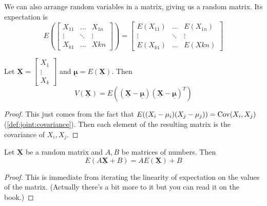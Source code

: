 \documentclass[12pt]{extarticle}
\newcommand{\cov}{{\operatorfont Cov}}
\renewcommand{\vec}[1]{\underline{\mathbf{#1}}}
\begin{document}
We can also arrange random variables in a matrix, giving us a random matrix.
Its expectation is
\begin{equation}
    E\left(\begin{bmatrix}
        X_{11} & \dots  & X_{1n} \\
        \vdots & \ddots & \vdots \\
        X_{k1} & \dots  & X{kn}
    \end{bmatrix}\right) =
    \begin{bmatrix}
        E(X_{11}) & \dots  & E(X_{1n}) \\
        \vdots    & \ddots & \vdots    \\
        E(X_{k1}) & \dots  & E(X{kn})
    \end{bmatrix}
\end{equation}

\begin{proposition}
    \label{prop:gen:variance_mat}
    Let $\vec X =
        \begin{bmatrix}
            X_1    \\
            \vdots \\
            X_k
        \end{bmatrix}$ and $\vec \mu = E(\vec X)$.
    Then
    \begin{equation}
        V(\vec X) = E \left( \left(\vec X - \vec \mu\right) \left(\vec X - \vec \mu\right)^T \right)
    \end{equation}
\end{proposition}

\begin{proof}
    This just comes from the fact that $E((X_i - \mu_i)(X_j - \mu_j)) = \cov(X_i, X_j)$ (\autoref{def:joint:covariance}).
    Then each element of the resulting matrix is the covariance of $X_i, X_j$.
\end{proof}

\begin{theorem}
    Let $\vec X$ be a random matrix and $A, B$ be matrices of numbers.
    Then
    \begin{equation}
        E(A \vec X + B) = A E(\vec X) + B
    \end{equation}
\end{theorem}
\begin{proof}
    This is immediate from iterating the linearity of expectation on the values of the matrix.
    (Actually there's a bit more to it but you can read it on the book.)
\end{proof}
\end{document}
